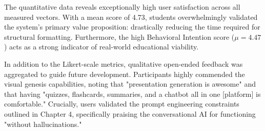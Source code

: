 \begin{table}[htbp]
\centering
{}
\vspace{6pt}
\caption{User Acceptance Testing (UAT) results across 15 participants ($N=15$), utilizing a 5-point Likert scale.}
\label{tab:uat_results}
\end{table}

The quantitative data reveals exceptionally high user satisfaction across all measured vectors. With a mean score of 4.73, students overwhelmingly validated the system's primary value proposition: drastically reducing the time required for structural formatting. Furthermore, the high Behavioral Intention score ($\mu = 4.47$) acts as a strong indicator of real-world educational viability.

In addition to the Likert-scale metrics, qualitative open-ended feedback was aggregated to guide future development. Participants highly commended the visual genesis capabilities, noting that "presentation generation is awesome" and that having "quizzes, flashcards, summaries, and a chatbot all in one [platform] is comfortable." Crucially, users validated the prompt engineering constraints outlined in Chapter 4, specifically praising the conversational AI for functioning "without hallucinations." 

